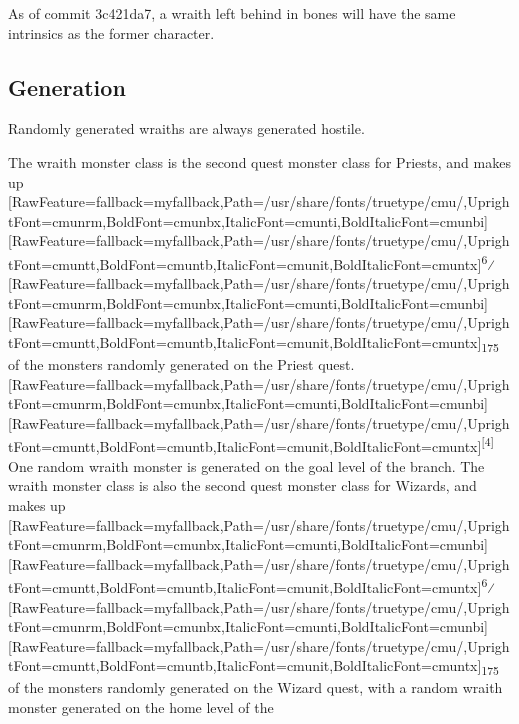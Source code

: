 As of commit 3c421da7\footnotemark[20], a wraith left behind in bones will have the same intrinsics as the former character.
\subsection{Generation}
\label{2}
Randomly generated wraiths are always generated hostile.


The wraith monster class is the second quest\footnotemark[21] monster class for Priests\footnotemark[22], and makes up \allowbreak{}\setmainfont{cmunrm.ttf}[RawFeature={fallback=myfallback},Path=/usr/share/fonts/truetype/cmu/,UprightFont=cmunrm,BoldFont=cmunbx,ItalicFont=cmunti,BoldItalicFont=cmunbi]\setmonofont{cmunrm.ttf}[RawFeature={fallback=myfallback},Path=/usr/share/fonts/truetype/cmu/,UprightFont=cmuntt,BoldFont=cmuntb,ItalicFont=cmunit,BoldItalicFont=cmuntx]\textsuperscript{6}⁄\allowbreak{}\setmainfont{cmunrm.ttf}[RawFeature={fallback=myfallback},Path=/usr/share/fonts/truetype/cmu/,UprightFont=cmunrm,BoldFont=cmunbx,ItalicFont=cmunti,BoldItalicFont=cmunbi]\setmonofont{cmunrm.ttf}[RawFeature={fallback=myfallback},Path=/usr/share/fonts/truetype/cmu/,UprightFont=cmuntt,BoldFont=cmuntb,ItalicFont=cmunit,BoldItalicFont=cmuntx]\textsubscript{175} of the monsters randomly generated on the Priest quest\footnotemark[23].\allowbreak{}\setmainfont{cmunrm.ttf}[RawFeature={fallback=myfallback},Path=/usr/share/fonts/truetype/cmu/,UprightFont=cmunrm,BoldFont=cmunbx,ItalicFont=cmunti,BoldItalicFont=cmunbi]\setmonofont{cmunrm.ttf}[RawFeature={fallback=myfallback},Path=/usr/share/fonts/truetype/cmu/,UprightFont=cmuntt,BoldFont=cmuntb,ItalicFont=cmunit,BoldItalicFont=cmuntx]\textsuperscript{{$\text{[}$}4{$\text{]}$}} One random wraith monster is generated on the goal level of the branch. The wraith monster class is also the second quest\footnotemark[24] monster class for Wizards\footnotemark[25], and makes up \allowbreak{}\setmainfont{cmunrm.ttf}[RawFeature={fallback=myfallback},Path=/usr/share/fonts/truetype/cmu/,UprightFont=cmunrm,BoldFont=cmunbx,ItalicFont=cmunti,BoldItalicFont=cmunbi]\setmonofont{cmunrm.ttf}[RawFeature={fallback=myfallback},Path=/usr/share/fonts/truetype/cmu/,UprightFont=cmuntt,BoldFont=cmuntb,ItalicFont=cmunit,BoldItalicFont=cmuntx]\textsuperscript{6}⁄\allowbreak{}\setmainfont{cmunrm.ttf}[RawFeature={fallback=myfallback},Path=/usr/share/fonts/truetype/cmu/,UprightFont=cmunrm,BoldFont=cmunbx,ItalicFont=cmunti,BoldItalicFont=cmunbi]\setmonofont{cmunrm.ttf}[RawFeature={fallback=myfallback},Path=/usr/share/fonts/truetype/cmu/,UprightFont=cmuntt,BoldFont=cmuntb,ItalicFont=cmunit,BoldItalicFont=cmuntx]\textsubscript{175} of the monsters randomly generated on the Wizard quest\footnotemark[26], with a random wraith monster generated on the home level of the 